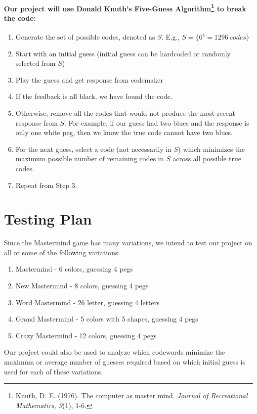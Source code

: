 \documentclass{article}
\begin{document}
\paragraph[]{Our project will use Donald Knuth's Five-Guess Algorithm\footnote{Knuth, D. E. (1976). The computer as master mind. \textit{Journal of Recreational Mathematics, 9}(1), 1-6.} to break the code:}

\begin{enumerate}
	\item Generate the set of possible codes, denoted as $S$. E.g., $S= \{ 6^4=1296 \ codes\}$
	\item Start with an initial guess (initial guess can be hardcoded or randomly selected from $S$) 
	\item Play the guess and get response from codemaker
	\item If the feedback is all black, we have found the code.
	\item Otherwise, remove all the codes that would not produce the most recent response from $S$. For example, if our guess had two blues and the response is only one white peg, then we know the true code cannot have two blues.
	\item For the next guess, select a code (not necessarily in $S$) which minimizes the maximum possible number of remaining codes in $S$ across all possible true codes.
	\item Repeat from Step 3.
\end{enumerate}

\section{Testing Plan}
Since the Mastermind game has many variations, we intend to test our project on all or some of the following variations:
\begin{enumerate}
	\item Mastermind - 6 colors, guessing 4 pegs 
	\item New Mastermind - 8 colors, guessing 4 pegs 
	\item Word Mastermind - 26 letter, guessing 4 letters
	\item Grand Mastermind - 5 colors with 5 shapes, guessing 4 pegs 
	\item Crazy Mastermind - 12 colors, guessing 4 pegs 

\end{enumerate}
Our project could also be used to analyze which codewords minimize the maximum or average number of guesses required based on which initial guess is used for each of these variations.
\end{document}
